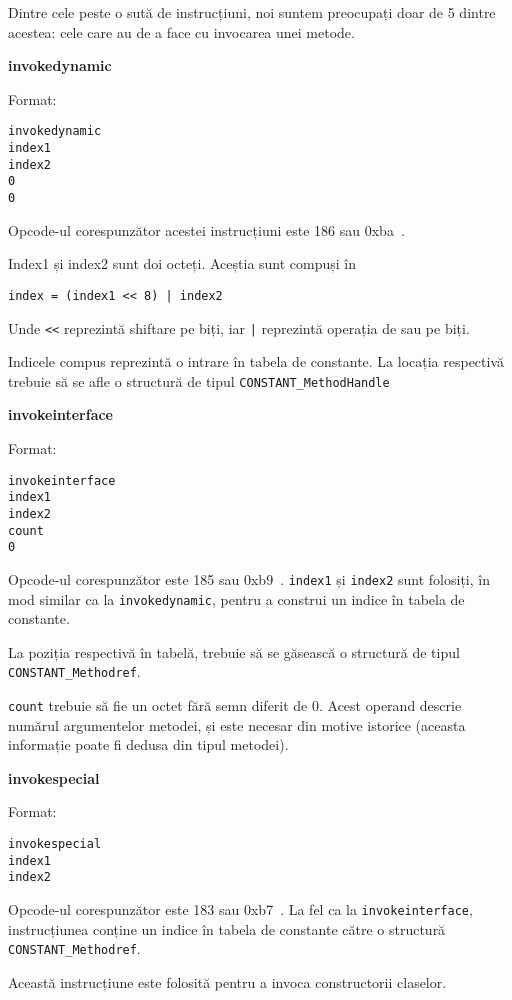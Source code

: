 Dintre cele peste o sută de instrucțiuni, noi suntem preocupați doar de
5 dintre acestea: cele care au de a face cu invocarea unei metode.

\textbf{invokedynamic}

Format:
\begin{verbatim}
invokedynamic
index1
index2
0
0
\end{verbatim}

Opcode-ul corespunzător acestei instrucțiuni este 186 sau
0xba~\cite{instruction_format}.

Index1 și index2 sunt doi octeți. Aceștia sunt compuși în
\begin{lstlisting}
index = (index1 << 8) | index2
\end{lstlisting}
Unde \texttt{<<} reprezintă shiftare pe biți, iar \texttt{|}
reprezintă operația de sau pe biți.

Indicele compus reprezintă o intrare în tabela de constante. La locația
respectivă trebuie să se afle o structură de tipul
\texttt{CONSTANT\_MethodHandle}

\textbf{invokeinterface}

Format:
\begin{verbatim}
invokeinterface
index1
index2
count
0
\end{verbatim}

Opcode-ul corespunzător este 185 sau 0xb9~\cite{instruction_format}.
\texttt{index1} și \texttt{index2} sunt folosiți, în mod similar ca la
\texttt{invokedynamic}, pentru a construi un indice în tabela
de constante.

La poziția respectivă în tabelă, trebuie să se găsească o structură de
tipul \texttt{CONSTANT\_Methodref}.

\texttt{count} trebuie să fie un octet fără semn diferit de 0. Acest
operand descrie numărul argumentelor metodei, și este necesar din motive
istorice (aceasta informație poate fi dedusa din tipul metodei).

\textbf{invokespecial}

Format:
\begin{verbatim}
invokespecial
index1
index2
\end{verbatim}

Opcode-ul corespunzător este 183 sau 0xb7~\cite{instruction_format}. La fel ca la
\texttt{invokeinterface}, instrucțiunea conține un indice în tabela de constante
către o structură \texttt{CONSTANT\_Methodref}.

Această instrucțiune este folosită pentru a invoca constructorii
claselor.

